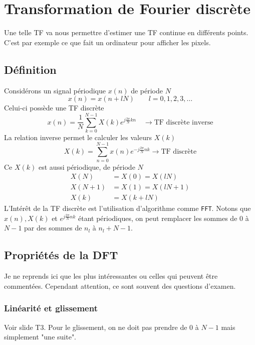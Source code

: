 \chapter{Transformation de Fourier discrète}
Une telle TF va nous permettre d'estimer une TF continue en différents points. C'est par 
exemple ce que fait un ordinateur pour afficher les pixels. 
\section{Définition}
Considérons un signal périodique $x(n)$ de période $N$
\begin{equation}
x(n) = x(n+lN)\qquad l =0,1,2,3,\dots
\end{equation}
Celui-ci possède une TF discrète
\begin{equation}
x(n) = \frac{1}{N}\sum_{k=0}^{N-1} X(k)e^{j\frac{2\pi}{N}kn}\quad\rightarrow\text{TF discrète inverse}
\end{equation}
La relation inverse permet le calculer les valeurs $X(k)$
\begin{equation}
X(k) = \sum_{n=0}^{N-1} x(n)e^{-j\frac{2\pi}{N}nk} \rightarrow\text{TF discrète}
\end{equation}
Ce $X(k)$ est aussi périodique, de période $N$
\begin{equation}
\begin{array}{lll}
X(N) &= X(0) = X(lN)\\
X(N+1) &= X(1) = X(lN+1)\\
X(k) &= X(k+lN)
\end{array}
\end{equation}
L’Intérêt de la TF discrète est l'utilisation d'algorithme comme \texttt{FFT}. Notons que 
$x(n), X(k)$ et $e^{j\frac{2\pi}{N}nk}$ étant périodiques, on peut remplacer les sommes de 
0 à $N-1$ par des sommes de $n_l$ à $n_l+N-1$.

\section{Propriétés de la DFT}
Je ne reprends ici que les plus intéressantes ou celles qui peuvent être commentées. Cependant 
attention, ce sont souvent des questions d'examen.

	\subsection{Linéarité et glissement}
	Voir slide T3. Pour le glissement, on ne doit pas prendre de 0 à $N-1$ mais simplement 
	"une suite". 
	
